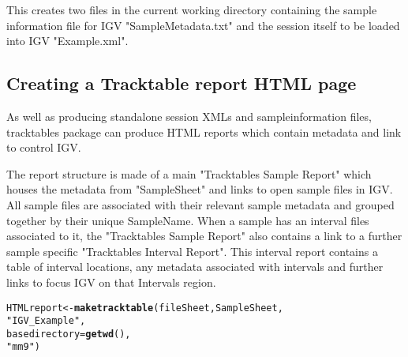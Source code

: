 \documentclass[12pt]{article}\usepackage[]{graphicx}\usepackage[usenames,dvipsnames]{color}
\makeatletter
\newcommand{\hlstr}[1]{\textcolor[rgb]{0.192,0.494,0.8}{#1}}%
\newcommand{\hlstd}[1]{\textcolor[rgb]{0.345,0.345,0.345}{#1}}%
\newcommand{\hlkwb}[1]{\textcolor[rgb]{0.69,0.353,0.396}{#1}}%
\newcommand{\hlkwc}[1]{\textcolor[rgb]{0.333,0.667,0.333}{#1}}%
\newcommand{\hlkwd}[1]{\textcolor[rgb]{0.737,0.353,0.396}{\textbf{#1}}}%
\newenvironment{kframe}{%
 \def\at@end@of@kframe{}%
 \ifinner\ifhmode%
  \def\at@end@of@kframe{\end{minipage}}%
  \begin{minipage}{\columnwidth}%
 \fi\fi%
 \def\FrameCommand##1{\hskip\@totalleftmargin \hskip-\fboxsep
 \colorbox{shadecolor}{##1}\hskip-\fboxsep
     \hskip-\linewidth \hskip-\@totalleftmargin \hskip\columnwidth}%
 \MakeFramed {\advance\hsize-\width
   \@totalleftmargin\z@ \linewidth\hsize
   \@setminipage}}%
 {\par\unskip\endMakeFramed%
 \at@end@of@kframe}
\newenvironment{knitrout}{}{} %
\makeatother
\begin{document}
This creates two files in the current working directory containing the sample information file for IGV "SampleMetadata.txt" and the session itself to be loaded into IGV "Example.xml".


\subsection{Creating a Tracktable report HTML page}

As well as producing standalone session XMLs and sampleinformation files, tracktables package can produce HTML reports which contain metadata and link to control IGV.

The report structure is made of a main "Tracktables Sample Report" which houses the metadata from "SampleSheet" and links to open sample files in IGV. All sample files are associated with their relevant sample metadata and grouped together by their unique SampleName. When a sample has an interval files associated to it, the "Tracktables Sample Report" also contains a link to a further sample specific "Tracktables Interval Report". This interval report contains a table of interval locations, any metadata associated with intervals and further links to focus IGV on that Intervals region. 

\begin{knitrout}
\color{fgcolor}\begin{kframe}
\begin{alltt}
  \hlstd{HTMLreport} \hlkwb{<-} \hlkwd{maketracktable}\hlstd{(fileSheet,SampleSheet,}
                               \hlstr{"IGV_Example"}\hlstd{,}
                               \hlkwc{basedirectory}\hlstd{=}\hlkwd{getwd}\hlstd{(),}
                               \hlstr{"mm9"}\hlstd{)}
\end{alltt}
\end{kframe}
\end{knitrout}



\end{document}
